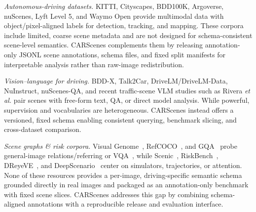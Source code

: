 \textit{Autonomous-driving datasets.} KITTI, Cityscapes, BDD100K, Argoverse, nuScenes, Lyft Level 5, and Waymo Open provide multimodal data with object/pixel-aligned labels for detection, tracking, and mapping. These corpora include limited, coarse scene metadata and are not designed for schema-consistent scene-level semantics. CARScenes complements them by releasing annotation-only JSONL scene annotations, schema files, and fixed split manifests for interpretable analysis rather than raw-image redistribution.

\textit{Vision–language for driving.} BDD-X, Talk2Car, DriveLM/DriveLM-Data, NuInstruct, nuScenes-QA, and recent traffic-scene VLM studies such as Rivera \emph{et al.} \cite{RefWorks:rivera2025scenario} pair scenes with free-form text, QA, or direct model analysis. While powerful, supervision and vocabularies are heterogeneous. CARScenes instead offers a versioned, fixed schema enabling consistent querying, benchmark slicing, and cross-dataset comparison.

\textit{Scene graphs \& risk corpora.} Visual Genome~\cite{RefWorks:krishna2017visual}, RefCOCO~\cite{RefWorks:chen2025revisiting}, and GQA~\cite{RefWorks:hudson2019gqa} probe general-image relations/referring or VQA~\cite{RefWorks:antol2015vqa}, while Scenic~\cite{RefWorks:fremont2019scenic}, RiskBench~\cite{RefWorks:kung2024riskbench}, DReyeVE~\cite{RefWorks:alletto2016dr}, and DeepScenario~\cite{RefWorks:lu2023deepscenario} center on simulators, trajectories, or attention. None of these resources provides a per-image, driving-specific semantic schema grounded directly in real images and packaged as an annotation-only benchmark with fixed scene slices. CARScenes addresses this gap by combining schema-aligned annotations with a reproducible release and evaluation interface.
